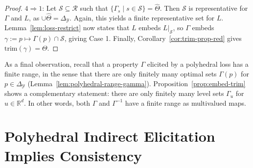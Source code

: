 \documentclass[twoside,11pt]{article}
\newcommand{\reals}{\mathbb{R}}
\newcommand{\simplex}{\Delta_\Y}
\newcommand{\R}{\mathcal{R}}
\newcommand{\Sc}{\mathcal{S}}
\newcommand{\U}{\mathcal{U}}
\newcommand{\Y}{\mathcal{Y}}
\newcommand{\trimred}{\mathrm{trim}}
\begin{document}
\begin{proof}
  $4 \Rightarrow 1$:
  Let $\Sc\subseteq\R$ such that $\{\Gamma_s \mid s\in\Sc\} = \hat \Theta$.
  Then $\Sc$ is representative for $\Gamma$ and $L$, as $\cup\hat\Theta = \simplex$.
  Again, this yields a finite representative set for $L$.
  Lemma~\ref{lem:loss-restrict} now states that $L$ embeds $L|_\Sc$, so $\Gamma$ embeds $\gamma := p \mapsto \Gamma(p) \cap \Sc$, giving Case 1.
  Finally, Corollary~\ref{cor:trim-prop-red} gives $\trimred(\gamma) = \Theta$.
\end{proof}

As a final observation, recall that a property $\Gamma$ elicited by a polyhedral loss has a finite range, in the sense that there are only finitely many optimal sets $\Gamma(p)$ for $p\in\simplex$ (Lemma~\ref{lem:polyhedral-range-gamma}).
Proposition~\ref{prop:embed-trim} shows a complementary statement: there are only finitely many level sets $\Gamma_u$ for $u\in\reals^d$.
In other words, both $\Gamma$ and $\Gamma^{-1}$ have a finite range as multivalued maps.

\section{Polyhedral Indirect Elicitation Implies Consistency}
\label{sec:poly-ie-consistency}
\end{document}
